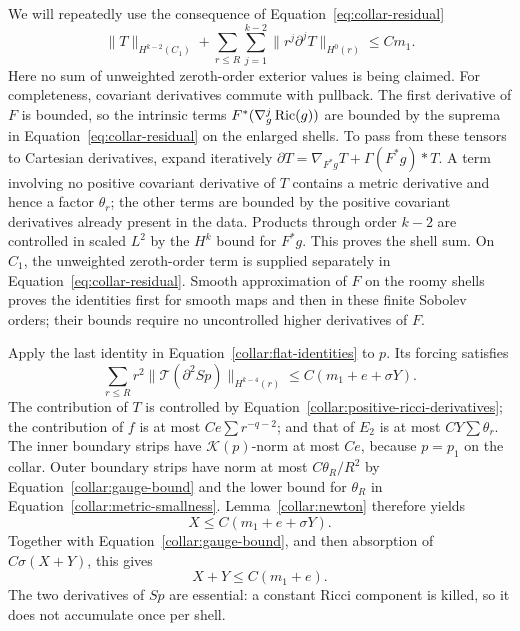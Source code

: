 We will repeatedly use the consequence of
Equation~\eqref{eq:collar-residual}
\begin{equation}
 \|T\|_{H^{k-2}(C_1)}
 +\sum_{r\le R}\sum_{j=1}^{k-2}
       \|r^j\partial^jT\|_{H^0(r)}
 \le Cm_1.
 \label{collar:positive-ricci-derivatives}
\end{equation}
Here no sum of unweighted zeroth-order exterior values is being
claimed.  For completeness, covariant derivatives commute with
pullback.  The first derivative of \(F\) is bounded, so the
intrinsic terms \(F^*(\nabla_g^j\operatorname{Ric}(g))\) are bounded by the
suprema in Equation~\eqref{eq:collar-residual} on the enlarged
shells.  To pass from these tensors to Cartesian derivatives,
expand iteratively \(\partial T=\nabla_{F^*g}T+\Gamma(F^*g)*T\).
A term involving no positive covariant derivative of \(T\)
contains a metric derivative and hence a factor \(\theta_r\);
the other terms are bounded by the positive covariant derivatives
already present in the data.  Products through order \(k-2\)
are controlled in scaled \(L^2\) by the \(H^k\) bound for
\(F^*g\).  This proves the shell sum.  On \(C_1\), the
unweighted zeroth-order term is supplied separately in
Equation~\eqref{eq:collar-residual}.  Smooth approximation of
\(F\) on the roomy shells proves the identities first for smooth
maps and then in these finite Sobolev orders; their bounds require
no uncontrolled higher derivatives of \(F\).

Apply the last identity in Equation~\eqref{collar:flat-identities}
to \(p\).  Its forcing satisfies
\begin{equation}
 \sum_{r\le R}r^2
 \|\mathcal T(\partial^2Sp)\|_{H^{k-4}(r)}
             \le C(m_1+e+\sigma Y).
 \label{collar:first-forcing}
\end{equation}
The contribution of \(T\) is controlled by
Equation~\eqref{collar:positive-ricci-derivatives}; the contribution
of \(f\) is at most \(Ce\sum r^{-q-2}\); and that of \(E_2\)
is at most \(CY\sum\theta_r\).  The inner boundary strips have
\(\mathcal K(p)\)-norm at most \(Ce\), because \(p=p_1\) on
the collar.  Outer boundary strips have norm at most
\(C\theta_R/R^2\) by Equation~\eqref{collar:gauge-bound} and
the lower bound for \(\theta_R\) in
Equation~\eqref{collar:metric-smallness}.  Lemma~\ref{collar:newton}
therefore yields
\[
 X\le C(m_1+e+\sigma Y).
\]
Together with Equation~\eqref{collar:gauge-bound}, and then
absorption of \(C\sigma(X+Y)\), this gives
\begin{equation}
 X+Y\le C(m_1+e).
 \label{collar:first-absorption}
\end{equation}
The two derivatives of \(Sp\) are essential: a constant Ricci
component is killed, so it does not accumulate once per shell.


